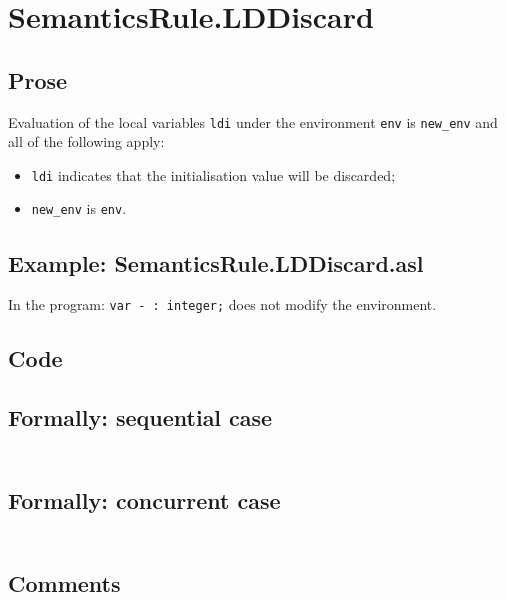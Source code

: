 \documentclass{book}
\begin{document}
\section{SemanticsRule.LDDiscard \label{sec:SemanticsRule.LDDiscard}}

    \subsection{Prose}
Evaluation of the local variables \texttt{ldi} under the environment
\texttt{env} is \texttt{new\_env} and all of the following apply:
    \begin{itemize}
    \item \texttt{ldi} indicates that the initialisation value will be discarded;
    \item \texttt{new\_env} is \texttt{env}.
    \end{itemize}

    \subsection{Example: SemanticsRule.LDDiscard.asl}
    In the program:
    \texttt{var - : integer;} does not modify the environment.

  \subsection{Code}

  \subsection{Formally: sequential case}
  \begin{align}
  \end{align} 

  \subsection{Formally: concurrent case}
  \begin{align}
  \end{align} 

    \subsection{Comments}
\end{document}
